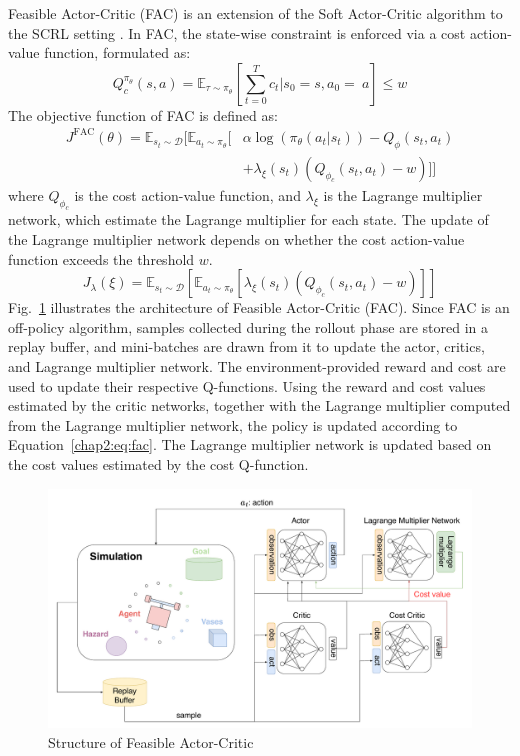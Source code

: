 Feasible Actor-Critic (FAC) is an extension of the Soft Actor-Critic algorithm to the SCRL setting \cite{FAC}.
In FAC, the state-wise constraint is enforced via a cost action-value function, formulated as:
\begin{equation}
  Q^{\pi_\theta}_c(s, a) = \mathbb{E}_{\tau \sim \pi_\theta}\left[\sum^T_{t = 0} c_t |s_0 = s, a_0 = ~a \right] \leq w
\end{equation}
The objective function of FAC is defined as:
\begin{equation} \label{chap2:eq:fac}
  \begin{aligned}
    J^{\text{FAC}}(\theta) = \mathbb{E}_{s_t \sim \mathcal{D}} \Big[ \mathbb{E}_{a_t \sim \pi_\theta} \big[ 
    &\alpha \log(\pi_\theta(a_t|s_t)) - Q_\phi(s_t, a_t) \\
    &+ \lambda_\xi(s_t)\left( Q_{\phi_c}(s_t, a_t) - w \right) 
    \big] \Big]
  \end{aligned}
\end{equation}
where $Q_{\phi_c}$ is the cost action-value function, and $\lambda_\xi$ is the Lagrange multiplier network, which estimate the Lagrange multiplier for each state.
The update of the Lagrange multiplier network depends on whether the cost action-value function exceeds the threshold $w$.
\begin{equation}
  J_\lambda(\xi) = \mathbb{E}_{s_t \sim \mathcal{D}} \left[ \mathbb{E}_{a_t \sim \pi_\theta} \left[ \lambda_\xi(s_t) \left( Q_{\phi_c}(s_t, a_t) - w \right) \right] \right]
\end{equation}
Fig.~\ref{chap2:fig:fac} illustrates the architecture of Feasible Actor-Critic (FAC). 
Since FAC is an off-policy algorithm, samples collected during the rollout phase are stored in a replay buffer, and mini-batches are drawn from it to update the actor, critics, and Lagrange multiplier network. 
The environment-provided reward and cost are used to update their respective Q-functions.
Using the reward and cost values estimated by the critic networks, together with the Lagrange multiplier computed from the Lagrange multiplier network, the policy is updated according to Equation~\ref{chap2:eq:fac}. 
The Lagrange multiplier network is updated based on the cost values estimated by the cost Q-function.
\begin{figure}[h]
  \centering
  \includegraphics[width=1.0\textwidth]{imgs/chap2/fac.pdf}
  \caption{Structure of Feasible Actor-Critic}
  \label{chap2:fig:fac}
\end{figure}

